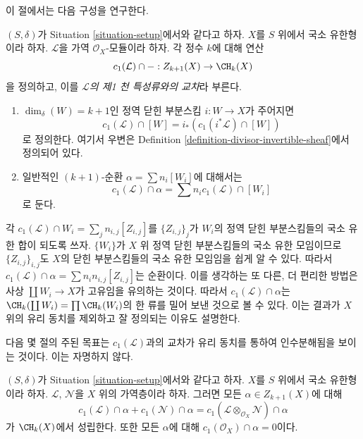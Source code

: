 \noindent
이 절에서는 다음 구성을 연구한다.

\begin{definition}
\label{definition-cap-c1}
$(S, \delta)$가 Situation \ref{situation-setup}에서와 같다고 하자.
$X$를 $S$ 위에서 국소 유한형이라 하자. $\mathcal{L}$을 가역
$\mathcal{O}_X$-모듈이라 하자. 각 정수 $k$에 대해 연산
$$
c_1(\mathcal{L}) \cap - :
Z_{k + 1}(X) \to \CH_k(X)
$$
을 정의하고, 이를 {\it $\mathcal{L}$의 제1 천 특성류와의 교차}라 부른다.
\begin{enumerate}
\item $\dim_\delta(W) = k + 1$인 정역 닫힌 부분스킴
$i : W \to X$가 주어지면
$$
c_1(\mathcal{L}) \cap [W] = i_*(c_1({i^*\mathcal{L}}) \cap [W])
$$
로 정의한다. 여기서 우변은 Definition
\ref{definition-divisor-invertible-sheaf}에서 정의되어 있다.
\item 일반적인 $(k + 1)$-순환 $\alpha = \sum n_i [W_i]$에 대해서는
$$
c_1(\mathcal{L}) \cap \alpha = \sum n_i c_1(\mathcal{L}) \cap [W_i]
$$
로 둔다.
\end{enumerate}
\end{definition}

\noindent
각 $c_1(\mathcal{L}) \cap W_i = \sum_j n_{i, j} [Z_{i, j}]$를
$\{Z_{i, j}\}_j$가 $W_i$의 정역 닫힌 부분스킴들의 국소 유한 합이 되도록
쓰자. $\{W_i\}$가 $X$ 위 정역 닫힌 부분스킴들의 국소 유한 모임이므로
$\{Z_{i, j}\}_{i, j}$도 $X$의 닫힌 부분스킴들의 국소 유한 모임임을 쉽게
알 수 있다. 따라서
$c_1(\mathcal{L}) \cap \alpha = \sum n_in_{i, j}[Z_{i, j}]$는 순환이다.
이를 생각하는 또 다른, 더 편리한 방법은 사상 $\coprod W_i \to X$가
고유임을 유의하는 것이다. 따라서 $c_1(\mathcal{L}) \cap \alpha$는
$\CH_k(\coprod W_i) = \prod \CH_k(W_i)$의 한 류를 밀어 보낸 것으로 볼
수 있다. 이는 결과가 $X$ 위의 유리 동치를 제외하고 잘 정의되는 이유도
설명한다.

\medskip\noindent
다음 몇 절의 주된 목표는 $c_1(\mathcal{L})$과의 교차가 유리 동치를
통하여 인수분해됨을 보이는 것이다. 이는 자명하지 않다.

\begin{lemma}
\label{lemma-c1-cap-additive}
$(S, \delta)$가 Situation \ref{situation-setup}에서와 같다고 하자.
$X$를 $S$ 위에서 국소 유한형이라 하자. $\mathcal{L}$, $\mathcal{N}$을
$X$ 위의 가역층이라 하자. 그러면 모든 $\alpha \in Z_{k + 1}(X)$에 대해
$$
c_1(\mathcal{L}) \cap \alpha  + c_1(\mathcal{N}) \cap \alpha =
c_1(\mathcal{L} \otimes_{\mathcal{O}_X} \mathcal{N}) \cap \alpha
$$
가 $\CH_k(X)$에서 성립한다. 또한 모든 $\alpha$에 대해
$c_1(\mathcal{O}_X) \cap \alpha = 0$이다.
\end{lemma}

